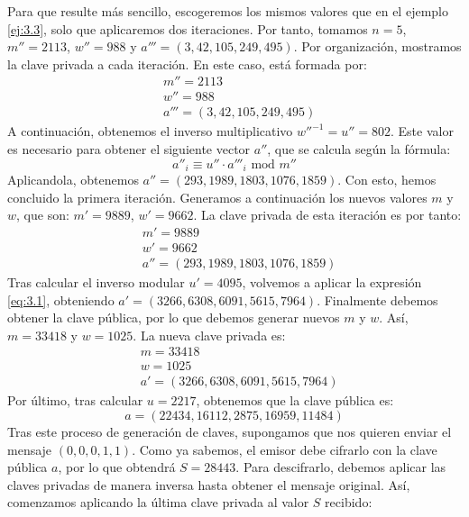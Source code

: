     \begin{ejemplo}
        Para que resulte más sencillo, escogeremos los mismos valores que en el ejemplo \ref{ej:3.3}, solo que aplicaremos dos iteraciones. Por tanto, tomamos $n = 5$, $m'' = 2113$, $w'' = 988$ y $a''' = (3, 42, 105, 249, 495)$. Por organización, mostramos la clave privada a cada iteración. En este caso, está formada por:
        \begin{align}
            &m'' = 2113 \\
            &w'' = 988 \\
            &a''' = (3, 42, 105, 249, 495)
        \end{align}
        A continuación, obtenemos el inverso multiplicativo $w''^{-1} = u'' = 802$. Este valor es necesario para obtener el siguiente vector $a''$, que se calcula según la fórmula:
        \begin{equation} \label{eq:3.1}
            a''_{i} \equiv u'' \cdot a'''_{i} \text{ mod } m''
        \end{equation}
        Aplicandola, obtenemos $a'' = (293, 1989, 1803, 1076, 1859)$. Con esto, hemos concluido la primera iteración. Generamos a continuación los nuevos valores $m$ y $w$, que son: $m' = 9889$, $w' = 9662$. La clave privada de esta iteración es por tanto:
        \begin{align}
            &m' = 9889 \\
            &w' = 9662 \\
            &a'' = (293, 1989, 1803, 1076, 1859)
        \end{align}
        Tras calcular el inverso modular $u' = 4095$, volvemos a aplicar la expresión \eqref{eq:3.1}, obteniendo $a' = (3266, 6308, 6091, 5615, 7964)$. Finalmente debemos obtener la clave pública, por lo que debemos generar nuevos $m$ y $w$. Así, $m = 33418$ y $w = 1025$. La nueva clave privada es:
        \begin{align}
            &m = 33418 \\
            &w = 1025 \\
            &a' = (3266, 6308, 6091, 5615, 7964)
        \end{align}
        Por último, tras calcular $u = 2217$, obtenemos que la clave pública es:
        \begin{equation}
            a = (22434, 16112, 2875, 16959, 11484)
        \end{equation}
        Tras este proceso de generación de claves, supongamos que nos quieren enviar el mensaje $(0, 0, 0, 1, 1)$. Como ya sabemos, el emisor debe cifrarlo con la clave pública $a$, por lo que obtendrá $S = 28443$. Para descifrarlo, debemos aplicar las claves privadas de manera inversa hasta obtener el mensaje original. Así, comenzamos aplicando la última clave privada al valor $S$ recibido:

\end{ejemplo}
